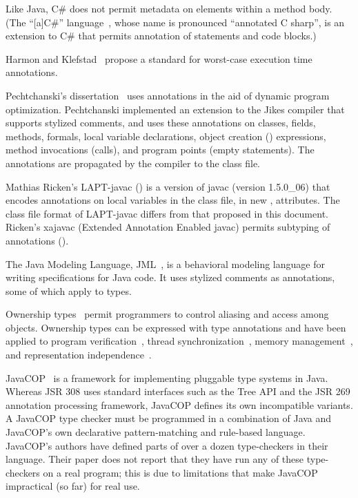 \documentclass[10pt]{article}
\begin{document}
Like Java, C\# does not permit
metadata on elements within a method body.
(The ``[a]C\#'' language~\cite{CazzolaCC2005:JOT}, whose name is pronounced
``annotated C sharp'', is an extension to C\# that permits annotation of
statements and code blocks.)

Harmon and Klefstad~\cite{HarmonK2007} propose a standard for worst-case
execution time annotations.


Pechtchanski's dissertation~\cite{Pechtchanski2003} uses annotations in the
aid of dynamic program optimization.  Pechtchanski implemented an extension
to the Jikes compiler that supports stylized comments, and uses these
annotations on classes, fields, methods, formals, local variable
declarations, object creation () expressions, method invocations
(calls), and program points (empty statements).  The annotations are
propagated by the compiler to the class file.


Mathias Ricken's LAPT-javac
() is a version
of javac (version 1.5.0\_06) that
encodes annotations on local variables in the class file, in new
, attributes.
The class file format of LAPT-javac differs from that proposed in this
document.
Ricken's xajavac (Extended Annotation Enabled
javac) permits subtyping of annotations ().


The Java Modeling Language, JML~\cite{LeavensBR2006:JML}, is a behavioral
modeling language for writing specifications for Java code.  It uses
stylized comments as annotations, some of which apply to types.


Ownership types~\cite{ClarkePN98,Boyapati2004:PhD,Clark2001,ClarkD2002,PotaninNCB2006,NobleVP98,DietlM2005,LeinoM2004,YuP2006}
permit programmers to control aliasing and access among objects.  Ownership
types can be expressed with type annotations
and have been applied to program
verification~\cite{LeinoM2004,Muller2002,MullerPHL2006}, thread
synchronization~\cite{BoyapatiLR2002,JacobsPLS2005}, memory
management~\cite{AndreaCGNVZ2006,BoyapatiSBR2003}, and representation
independence~\cite{BanerjeeN2002}.


JavaCOP~\cite{AndreaeNMM2006} is a framework for implementing pluggable
type systems in Java.  Whereas JSR 308 uses standard
interfaces such as the Tree API and the JSR 269 annotation processing
framework, JavaCOP defines its own incompatible variants.
A JavaCOP type checker must be programmed in a combination of Java and
JavaCOP's own declarative pattern-matching and rule-based language.
JavaCOP's authors have defined parts of over a dozen
type-checkers in their language.  Their paper does not report that they have
run any of these type-checkers on a real program; this is due to
limitations that make JavaCOP impractical (so far) for real use.
\end{document}
